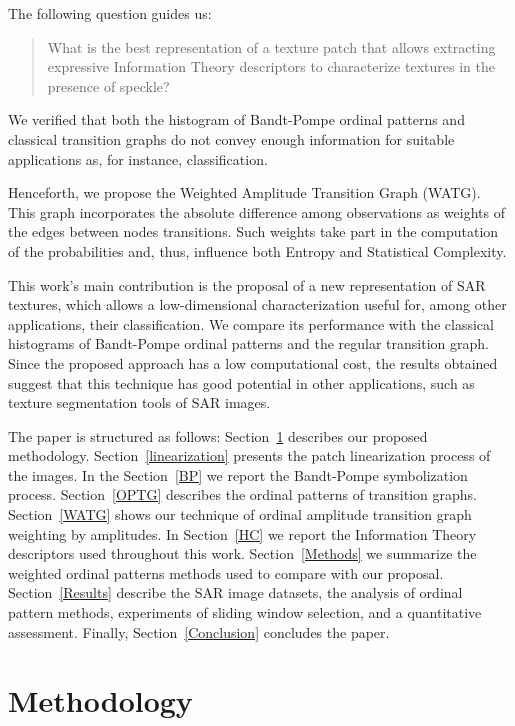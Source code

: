 \documentclass[journal]{IEEEtran}
\begin{document}
	The following question guides us:
	\begin{quote}
		What is the best representation of a texture patch that allows extracting expressive Information Theory descriptors to characterize textures in the presence of speckle?
	\end{quote}
	We verified that both the histogram of Bandt-Pompe ordinal patterns and classical transition graphs do not convey enough information for suitable applications as, for instance, classification.
	
	Henceforth, we propose the Weighted Amplitude Transition Graph (WATG).
	This graph incorporates the absolute difference among observations as weights of the edges between nodes transitions.
	Such weights take part in the computation of the probabilities and, thus, influence both Entropy and Statistical Complexity.
	
	This work's main contribution is the proposal of a new representation of SAR textures, which allows a low-dimensional characterization useful for, among other applications, their classification.
	We compare its performance with the classical histograms of Bandt-Pompe ordinal patterns and the regular transition graph.
	Since the proposed approach has a low computational cost, the results obtained suggest that this technique has good potential in other applications, such as texture segmentation tools of SAR images.
	
	The paper is structured as follows:
	Section~\ref{methodology} describes our proposed methodology.
	Section~\ref{linearization} presents the patch linearization process of the images.
	In the Section~\ref{BP} we report the Bandt-Pompe symbolization process.
	Section~\ref{OPTG} describes the ordinal patterns of transition graphs.
	Section~\ref{WATG} shows our technique of ordinal amplitude transition graph weighting by amplitudes.
	In Section~\ref{HC} we report the Information Theory descriptors used throughout this work.
	Section~\ref{Methods} we summarize the weighted ordinal patterns methods used to compare with our proposal.
	Section~\ref{Results} describe the SAR image datasets, 
	the analysis of ordinal pattern methods, 
	experiments of sliding window selection, 
	and a quantitative assessment.
	Finally, Section~\ref{Conclusion} concludes the paper.
	
	\section{Methodology}\label{methodology}
	
\end{document}
